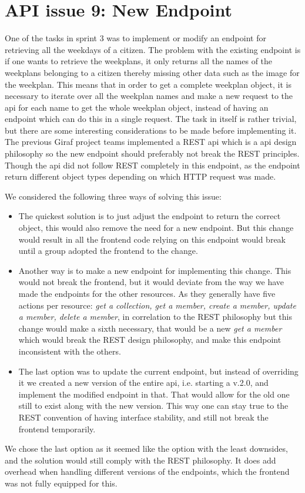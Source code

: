 \section{API issue 9: New Endpoint} \label{sec:webIssue9}

One of the tasks in sprint 3 was to implement or modify an endpoint for retrieving all the weekdays of a citizen. The problem with the existing endpoint is if one wants to retrieve the weekplans, it only returns all the names of the weekplans belonging to a citizen thereby missing other data such as the image for the weekplan. This means that in order to get a complete weekplan object, it is necessary to iterate over all the weekplan names and make a new request to the api for each name to get the whole weekplan object, instead of having an endpoint which can do this in a single request. 
The task in itself is rather trivial, but there are some interesting considerations to be made before implementing it. The previous Giraf project teams implemented a REST \gls{api} which is a \gls{api} design philosophy so the new endpoint should preferably not break the REST principles. Though the \gls{api} did not follow REST completely in this endpoint, as the endpoint return different object types depending on which HTTP request was made. 

We considered the following three ways of solving this issue:
\begin{itemize}
\item The quickest solution is to just adjust the endpoint to return the correct object, this would also remove the need for a new endpoint. But this change would result in all the frontend code relying on this endpoint would break until a group adopted the frontend to the change.
\item Another way is to make a new endpoint for implementing this change. This would not break the frontend, but it would deviate from the way we have made the endpoints for the other resources. As they generally have five actions per resource: \textit{get a collection, get a member, create a member, update a member, delete a member},  in correlation to the REST philosophy but this change would make a sixth necessary, that would be a new \textit{get a member} which would break the REST design philosophy, and make this endpoint inconsistent with the others.
\item The last option was to update the current endpoint, but instead of overriding it we created a new version of the entire \gls{api}, i.e. starting a v.2.0, and implement the modified endpoint in that. That would allow for the old one still to exist along with the new version. This way one can stay true to the REST convention of having interface stability, and still not break the frontend temporarily.
\end{itemize}

We chose the last option as it seemed like the option with the least downsides, and the solution would still comply with the REST philosophy. It does add overhead when handling different versions of the endpoints, which the frontend was not fully equipped for this.
